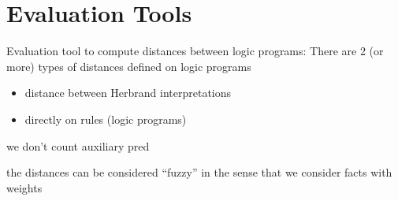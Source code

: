 \section{Evaluation Tools}
\label{sec:evaluation}

Evaluation tool to compute distances between logic programs:
 There are 2 (or more) types  of distances defined on logic programs
\begin{itemize}
    \item  distance between Herbrand interpretations 
    \item directly on rules (logic programs)  
\end{itemize}

we don't count auxiliary pred

the distances can be considered ``fuzzy'' in the sense that we consider facts with weights

